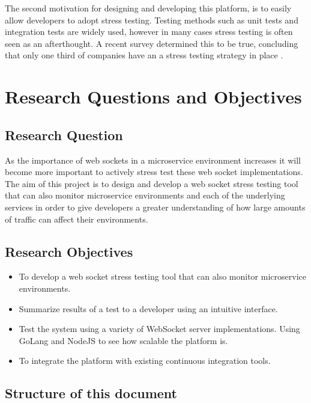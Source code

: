 The second motivation for designing and developing this platform, is to easily allow developers to adopt stress testing. Testing methods such as unit tests and integration tests are widely used, however in many cases stress testing is often seen as an afterthought. A recent survey determined this to be true, concluding that only one third of companies have an a stress testing strategy in place \cite{bezemer2019performance}.

\section{Research Questions and Objectives}

\subsection{Research Question}

As the importance of web sockets in a microservice environment increases it will become more important to actively stress test these web socket implementations. The aim of this project is to design and develop a web socket stress testing tool that can also monitor microservice environments and each of the underlying services in order to give developers a greater understanding of how large amounts of traffic can affect their environments.

\subsection{Research Objectives}

\begin{itemize}
  \item To develop a web socket stress testing tool that can also monitor microservice environments.
  \item Summarize results of a test to a developer using an intuitive interface.
  \item Test the system using a variety of WebSocket server implementations. Using GoLang and NodeJS to see how scalable the platform is.
  \item To integrate the platform with existing continuous integration tools.
\end{itemize}

\subsection{Structure of this document}

